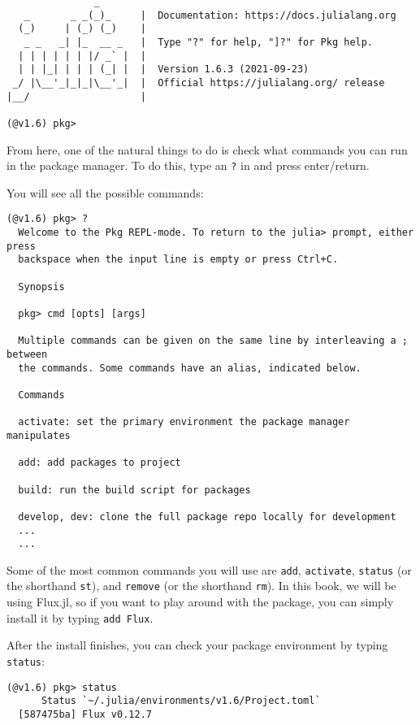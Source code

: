 \documentclass[
  notoc %
]{tufte-book}
\newcommand{\passthrough}[1]{#1}
\begin{document}
\begin{lstlisting}
               _
   _       _ _(_)_     |  Documentation: https://docs.julialang.org
  (_)     | (_) (_)    |
   _ _   _| |_  __ _   |  Type "?" for help, "]?" for Pkg help.
  | | | | | | |/ _` |  |
  | | |_| | | | (_| |  |  Version 1.6.3 (2021-09-23)
 _/ |\__'_|_|_|\__'_|  |  Official https://julialang.org/ release
|__/                   |

(@v1.6) pkg> 
\end{lstlisting}

From here, one of the natural things to do is check what commands you
can run in the package manager. To do this, type an
\passthrough{\lstinline!?!} in and press enter/return.

You will see all the possible commands:

\begin{lstlisting}
(@v1.6) pkg> ?
  Welcome to the Pkg REPL-mode. To return to the julia> prompt, either press
  backspace when the input line is empty or press Ctrl+C.

  Synopsis

  pkg> cmd [opts] [args]

  Multiple commands can be given on the same line by interleaving a ; between
  the commands. Some commands have an alias, indicated below.

  Commands

  activate: set the primary environment the package manager manipulates

  add: add packages to project

  build: run the build script for packages

  develop, dev: clone the full package repo locally for development
  ...
  ...
\end{lstlisting}

Some of the most common commands you will use are
\passthrough{\lstinline!add!}, \passthrough{\lstinline!activate!},
\passthrough{\lstinline!status!} (or the shorthand
\passthrough{\lstinline!st!}), and \passthrough{\lstinline!remove!} (or
the shorthand \passthrough{\lstinline!rm!}). In this book, we will be
using Flux.jl, so if you want to play around with the package, you can
simply install it by typing \passthrough{\lstinline!add Flux!}.

After the install finishes, you can check your package environment by
typing \passthrough{\lstinline!status!}:

\begin{lstlisting}
(@v1.6) pkg> status
      Status `~/.julia/environments/v1.6/Project.toml`
  [587475ba] Flux v0.12.7
\end{lstlisting}
\end{document}
